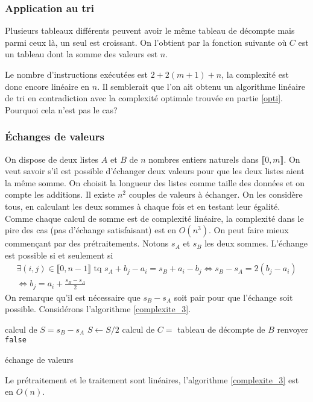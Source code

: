 \subsubsection{Application au tri}
Plusieurs tableaux différents peuvent avoir le même tableau de décompte mais parmi ceux là, un seul est croissant. On l'obtient par la fonction suivante où $C$ est un tableau dont la somme des valeurs est $n$.

Le nombre d'instructions exécutées est $2+2(m+1)+n$, la complexité est donc encore linéaire en $n$.\newline
Il semblerait que l'on ait obtenu un algorithme linéaire de tri en contradiction avec la complexité optimale trouvée en partie \ref{opti}. Pourquoi cela n'est pas le cas?

\subsubsection{\'Echanges de valeurs}
On dispose de deux listes $A$ et $B$ de $n$ nombres entiers naturels dans $\llbracket 0,m\rrbracket$. On veut savoir s'il est possible d'échanger deux valeurs pour que les deux listes aient la même somme. On choisit la longueur des listes comme taille des données et on compte les additions.\newline
Il existe $n^2$ couples de valeurs à échanger. On les considère tous, en calculant les deux sommes à chaque fois et en testant leur égalité. Comme chaque calcul de somme est de complexité linéaire, la complexité dans le pire des cas (pas d'échange satisfaisant) est en $O(n^3)$.\newline
On peut faire mieux commençant par des prétraitements. Notons $s_A$ et $s_B$ les deux sommes. L'échange est possible si et seulement si 
\begin{multline*}
  \exists (i,j)\in \llbracket 0, n-1 \rrbracket \text{ tq } s_A + b_j -a_i = s_B + a_i - b_j\Leftrightarrow s_B - s_A = 2(b_j - a_i)\\
\Leftrightarrow b_j = a_i + \frac{s_B - s_A}{2}
\end{multline*}
On remarque qu'il est nécessaire que $s_B - s_A$ soit pair pour que l'échange soit possible.
Considérons l'algorithme \ref{complexite_3}.
\begin{algorithm}
  calcul de $S = s_B - s_A$\;
  $S \leftarrow S/2$\;
  calcul de $C=$ tableau de décompte de $B$\;
  renvoyer \texttt{false}\;
  \caption{échange de valeurs}
  \label{complexite_3}
\end{algorithm}
Le prétraitement et le traitement sont linéaires, l'algorithme \ref{complexite_3} est en $O(n)$.

